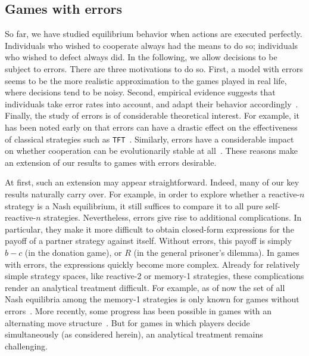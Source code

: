 \documentclass[9pt,twoside,lineno]{pnas-new}
\theoremstyle{plainCl1}
\theoremstyle{plainCl2}
\def\tft{\texttt{TFT}}
\begin{document}
 
 
 
 

\subsection{Games with errors}
\label{section:errors}

So far, we have studied equilibrium behavior when actions are executed perfectly. 
Individuals who wished to cooperate always had the means to do so; individuals who wished to defect always did.
In the following, we allow decisions to be subject to errors.
There are three motivations to do so. 
First, a model with errors seems to be the more realistic approximation to the games played in real life, where decisions tend to be noisy. 
Second, empirical evidence suggests that individuals take error rates into account, and adapt their behavior accordingly~\cite{fudenberg:aer:2012,Arechar:GEB:2017}. 
Finally, the study of errors is of considerable theoretical interest. 
For example, it has been noted early on that errors can have a drastic effect on the effectiveness of classical strategies such as \tft{}~\citep{molander:jcr:1985, axelrod:Science:1988, wu:JCR:1995}. 
Similarly, errors have a considerable impact on whether cooperation can be evolutionarily stable at all~\citep{boyd:Nature:1987,boyd:JTB:1989,garcia:jet:2016}. 
These reasons make an extension of our results to games with errors desirable. 

At first, such an extension may appear straightforward. 
Indeed, many of our key results naturally carry over. 
For example, in order to explore whether a reactive-$n$ strategy is a Nash equilibrium, it still suffices to compare it to all pure self-reactive-$n$ strategies.
Nevertheless, errors give rise to additional complications. 
In particular, they make it more difficult to obtain closed-form expressions for the payoff of a partner strategy against itself. 
Without errors, this payoff is simply $b\!-\!c$ (in the donation game), or $R$ (in the general prisoner's dilemma). 
In games with errors, the expressions quickly become more complex. 
Already for relatively simple strategy spaces, like reactive-2 or memory-1 strategies, these complications render an analytical treatment difficult. 
For example, as of now the set of all Nash equilibria among the memory-1 strategies is only known for games without errors~\citep{akin:EGADS:2016,stewart:pnas:2014}. 
More recently, some progress has been possible in games with an alternating move structure~\citep{park:NComms:2022}. 
But for games in which players decide simultaneously (as considered herein), an analytical treatment remains challenging.
\end{document}
